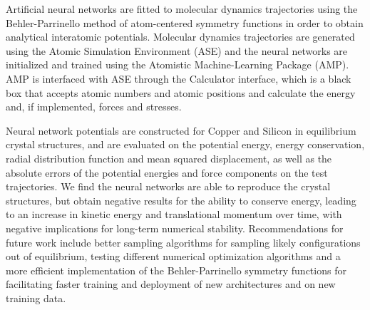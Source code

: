 Artificial neural networks are fitted to molecular dynamics trajectories
using the Behler-Parrinello method of atom-centered symmetry functions
in order to obtain analytical interatomic potentials.
Molecular dynamics trajectories are generated using the Atomic Simulation
Environment (ASE) and the neural networks are initialized and trained
using the Atomistic Machine-Learning Package (AMP). AMP is interfaced
with ASE through the Calculator interface, which is a black box
that accepts atomic numbers and atomic positions and calculate
the energy and, if implemented, forces and stresses.
\par
Neural network potentials are constructed for Copper and Silicon
in equilibrium crystal structures, and are evaluated on the potential energy,
energy conservation, radial distribution function and mean
squared displacement, as well as the absolute errors of the
potential energies and force components on the test trajectories.
We find the neural networks are able to reproduce the crystal structures,
but obtain negative results for the ability to conserve energy,
leading to an increase in kinetic energy and translational momentum
over time, with negative implications for long-term numerical stability.
Recommendations for future work include better sampling
algorithms for sampling likely configurations out of equilibrium,
testing different numerical optimization algorithms
and a more efficient implementation of the Behler-Parrinello
symmetry functions for facilitating faster training and deployment
of new architectures and on new training data.
